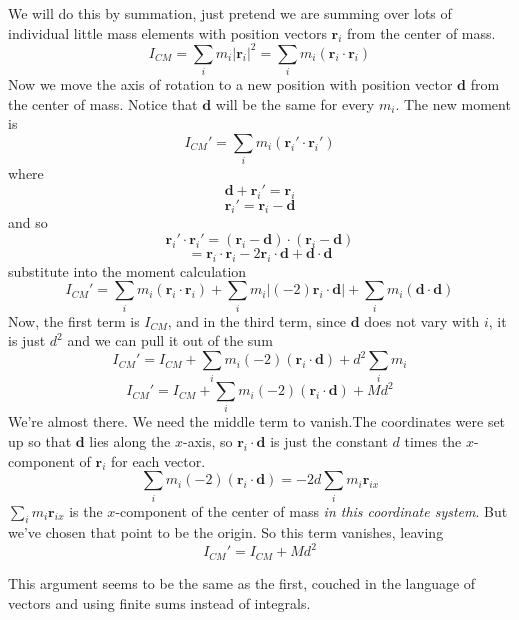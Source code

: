 \documentclass[11pt, oneside]{article}
\begin{document}
We will do this by summation, just pretend we are summing over lots of individual little mass elements with position vectors $\mathbf{r}_i$ from the center of mass.
\[ I_{CM} = \sum_i m_i |\mathbf{r}_i|^2 = \sum_i m_i (\mathbf{r}_i \cdot \mathbf{r}_i) \]
Now we move the axis of rotation to a new position with position vector $\mathbf{d}$ from the center of mass.  Notice that $\mathbf{d}$ will be the same for every $m_i$.  The new moment is
\[ I_{CM}' = \sum_i m_i (\mathbf{r}_i' \cdot \mathbf{r}_i') \] 
where
\[ \mathbf{d} +  \mathbf{r}_i'  = \mathbf{r}_i  \]
\[ \mathbf{r}_i' = \mathbf{r}_i - \mathbf{d} \]
and so
\[ \mathbf{r}_i' \cdot \mathbf{r}_i'  =  (\mathbf{r}_i - \mathbf{d}) \cdot (\mathbf{r}_i - \mathbf{d}) \]
\[ = \mathbf{r}_i \cdot \mathbf{r}_i - 2 \mathbf{r}_i \cdot  \mathbf{d} + \mathbf{d} \cdot \mathbf{d} \]
substitute into the moment calculation
\[ I_{CM}' = \sum_i m_i (\mathbf{r}_i \cdot \mathbf{r}_i) + \sum_i m_i |(-2) \mathbf{r}_i \cdot \mathbf{d} | + \sum_i m_i (\mathbf{d} \cdot \mathbf{d}) \] 
Now, the first term is $I_{CM}$, and in the third term, since $\mathbf{d}$ does not vary with $i$, it is just $d^2$ and we can pull it out of the sum
\[ I_{CM}' = I_{CM} + \sum_i m_i (-2)( \mathbf{r}_i \cdot \mathbf{d}) + d^2 \sum_i m_i \] 
\[ I_{CM}' = I_{CM} + \sum_i m_i (-2)( \mathbf{r}_i \cdot \mathbf{d}) + Md^2 \] 
We're almost there.  We need the middle term to vanish.The coordinates were set up so that $\mathbf{d}$ lies along the $x$-axis, so $ \mathbf{r}_i \cdot \mathbf{d}$ is just the constant $d$ times the $x$-component of $\mathbf{r}_i$ for each vector.
\[ \sum_i m_i (-2)( \mathbf{r}_i \cdot \mathbf{d})  = -2d \sum_i m_i  \mathbf{r}_{ix} \]
$\sum_i m_i  \mathbf{r}_{ix}$ is the $x$-component of the center of mass \emph{in this coordinate system}.  But we've chosen that point to be the origin.  So this term vanishes, leaving
\[ I_{CM}' = I_{CM} + Md^2 \] 

This argument seems to be the same as the first, couched in the language of vectors and using finite sums instead of integrals.
\end{document}
